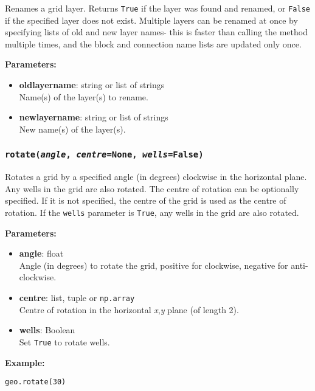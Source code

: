 Renames a grid layer.  Returns \texttt{True} if the layer was found and renamed, or \texttt{False} if the specified layer does not exist.  Multiple layers can be renamed at once by specifying lists of old and new layer names- this is faster than calling the method multiple times, and the block and connection name lists are updated only once.

\textbf{Parameters:}
\begin{itemize}
  \item \textbf{oldlayername}: string or list of strings\\
    Name(s) of the layer(s) to rename.
  \item \textbf{newlayername}: string or list of strings\\
    New name(s) of the layer(s).
\end{itemize}

\subsubsection{\texttt{rotate(\emph{angle}, \emph{centre}=\texttt{None}, \emph{wells}=\texttt{False})}}
\label{sec:rotate}

Rotates a grid by a specified angle (in degrees) clockwise in the horizontal plane.  Any wells in the grid are also rotated.  The centre of rotation can be optionally specified.  If it is not specified, the centre of the grid is used as the centre of rotation.  If the \texttt{wells} parameter is \texttt{True}, any wells in the grid are also rotated.

\textbf{Parameters:}
\begin{itemize}
  \item \textbf{angle}: float\\
    Angle (in degrees) to rotate the grid, positive for clockwise, negative for anti-clockwise.
  \item \textbf{centre}: list, tuple or \texttt{np.array}\\
    Centre of rotation in the horizontal \emph{x},\emph{y} plane (of length 2).
  \item \textbf{wells}: Boolean\\
    Set \texttt{True} to rotate wells.
\end{itemize}

\textbf{Example:}

\begin{verbatim}
geo.rotate(30)
\end{verbatim}

